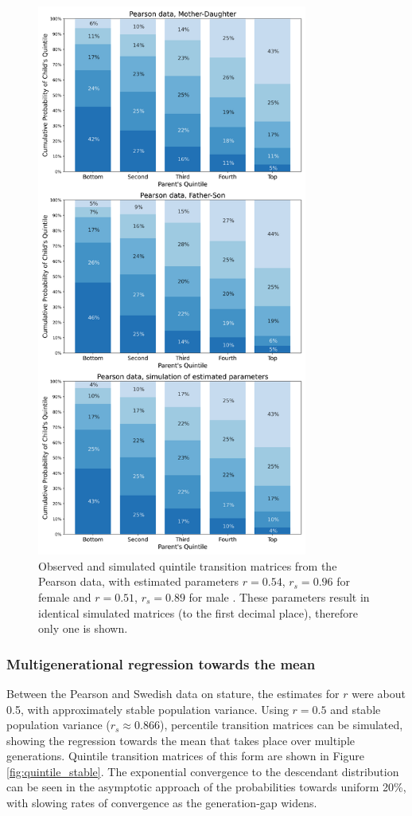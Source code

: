 \documentclass[a4paper,11pt]{article} %
\begin{document}
\begin{figure}[H]
\centering
\advance\leftskip-0.4in
\includegraphics[width=3.5in]{figures/quintile-pearson.png} 
\caption{Observed and simulated quintile transition matrices from the Pearson data, with estimated parameters $r = 0.54$, $r_s = 0.96$ for female and $r = 0.51$, $r_s = 0.89$ for male \cite{pearson}. These parameters result in identical simulated matrices (to the first decimal place), therefore only one is shown.}
\label{fig:quintile_pearson}
\end{figure}

\subsubsection*{Multigenerational regression towards the mean}
Between the Pearson and Swedish data on stature, the estimates for $r$ were about 0.5, with approximately stable population variance. Using $r = 0.5$ and stable population variance ($r_s \approx 0.866$), percentile transition matrices can be simulated, showing the regression towards the mean that takes place over multiple generations. Quintile transition matrices of this form are shown in Figure \ref{fig:quintile_stable}. The exponential convergence to the descendant distribution can be seen in the asymptotic approach of the probabilities towards uniform 20\%, with slowing rates of convergence as the generation-gap widens. 
\end{document}

